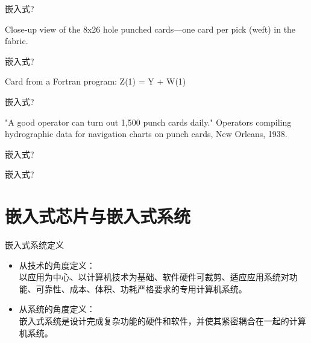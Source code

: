 \begin{frame}{嵌入式?}
\begin{center}\end{center}
Close-up view of the 8x26 hole punched cards---one card per pick (weft) in the fabric.
\end{frame}

\begin{frame}{嵌入式?}
\begin{center}\end{center}
Card from a Fortran program: Z(1) = Y + W(1)
\end{frame}

\begin{frame}{嵌入式?}
\begin{center}\end{center}
"A good operator can turn out 1,500 punch cards daily." Operators compiling hydrographic data for navigation charts on punch cards, New Orleans, 1938.
\end{frame}


\begin{frame}{嵌入式?}
\begin{center}\end{center}
\end{frame}

\begin{frame}{嵌入式?}
\begin{center}\end{center}
\end{frame}


\section{嵌入式芯片与嵌入式系统}


\begin{frame}{嵌入式系统定义}
\begin{itemize}
\item 从技术的角度定义：\\
以应用为中心、以计算机技术为基础、软件硬件可裁剪、适应应用系统对功能、可靠性、成本、体积、功耗严格要求的专用计算机系统。
\item 从系统的角度定义：\\
嵌入式系统是设计完成复杂功能的硬件和软件，并使其紧密耦合在一起的计算机系统。
\end{itemize}
\end{frame}


